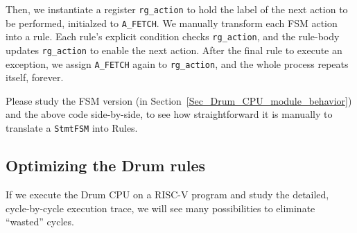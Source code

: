 Then, we instantiate a register \verb|rg_action| to hold the label of
the next action to be performed, initialzed to \verb|A_FETCH|.  We
manually transform each FSM action into a rule.  Each rule's explicit
condition checks \verb|rg_action|, and the rule-body updates
\verb|rg_action| to enable the next action.  After the final rule to
execute an exception, we assign \verb|A_FETCH| again to
\verb|rg_action|, and the whole process repeats itself, forever.



Please study the FSM version (in
Section~\ref{Sec_Drum_CPU_module_behavior}) and the above code
side-by-side, to see how straightforward it is manually to translate a
\verb|StmtFSM| into Rules.


\subsection{Optimizing the Drum rules}

If we execute the Drum CPU on a RISC-V program and study the detailed,
cycle-by-cycle execution trace, we will see many possibilities to
eliminate ``wasted'' cycles.

